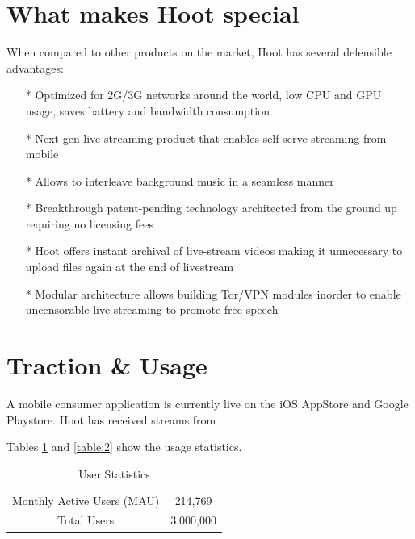 \documentclass{article}
\begin{document}
\section{What makes Hoot special}
When compared to other products on the market, Hoot has several defensible advantages:
\begin{itemize}
\item[*]Optimized for 2G/3G networks around the world, low CPU and GPU usage, saves battery and bandwidth consumption
\item[*]Next-gen live-streaming product that enables self-serve streaming from mobile
\item[*]Allows to interleave background music in a seamless manner
\item[*]Breakthrough patent-pending technology architected from the ground up requiring no licensing fees
\item[*]Hoot offers instant archival of live-stream videos making it unnecessary to upload files again at the end of livestream
\item[*]Modular architecture allows building Tor/VPN modules inorder to enable uncensorable live-streaming to promote free speech
\end{itemize}


\section{Traction \& Usage}
A mobile consumer application is currently live on the iOS AppStore and Google Playstore. Hoot has received streams from 


Tables \ref{table:1} and \ref{table:2} show the usage statistics.

\setlength{\arrayrulewidth}{.7mm}
\setlength{\tabcolsep}{18pt}
\renewcommand{\arraystretch}{2.0} 
 


\begin{table}[!htb]
\centering
\begin{tabular}{ |c|c| }
\hline
\rowcolor{lightgray} \multicolumn{2}{|c|}{User Statistics} \\
\hline
Monthly Active Users (MAU) & 214,769 \\
Total Users & 3,000,000  \\
\hline
\end{tabular}
\caption{User Statistics}
\label{table:1}
\end{table}
\end{document}
